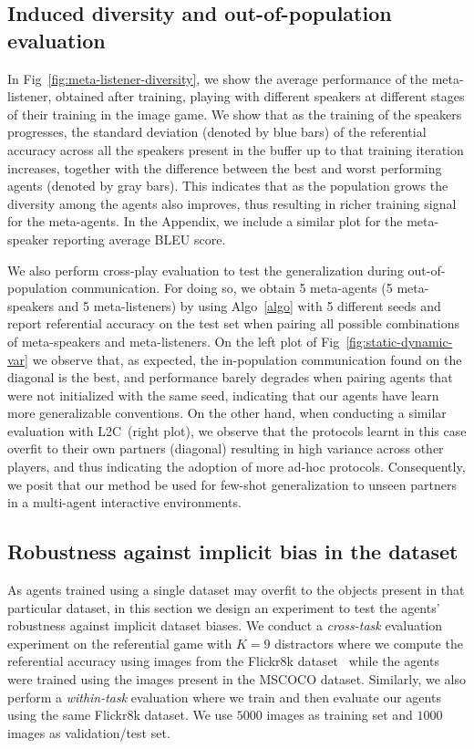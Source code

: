 \documentclass{article}
\newcommand{\ltc}{\textsc{L2C\xspace}}
\begin{document}
\subsection{Induced diversity and out-of-population evaluation}
\label{subsec:diversity}
In Fig~\ref{fig:meta-listener-diversity},  we show the average performance of the meta-listener, obtained after training, playing with different speakers at different stages of their training in the image game. We show that as the training of the speakers progresses, the standard deviation (denoted by blue bars) of the referential accuracy across all the speakers present in the buffer up to that training iteration increases, together with the difference between the best and worst performing agents (denoted by gray bars). This indicates that as the population grows the diversity among the agents also improves, thus resulting in richer training signal for the meta-agents. In the Appendix, we include a similar plot for the meta-speaker reporting average BLEU score.

We also perform cross-play evaluation to test the generalization during out-of-population communication. For doing so, we obtain 5 meta-agents (5 meta-speakers and 5 meta-listeners) by using Algo~\ref{algo} with 5 different seeds and report referential accuracy on the test set when pairing all possible combinations of meta-speakers and meta-listeners. On the left plot of Fig~\ref{fig:static-dynamic-var} we observe that, as expected, the in-population communication found on the diagonal is the best, and performance barely degrades when pairing agents that were not initialized with the same seed, indicating that our agents have learn more generalizable conventions. On the other hand, when conducting a similar evaluation with \ltc\ (right plot), we observe that the protocols learnt in this case overfit to their own partners (diagonal) resulting in high variance across other players, and thus indicating the adoption of more ad-hoc protocols. Consequently, we posit that our method be used for few-shot generalization to unseen partners in a multi-agent interactive environments.

\subsection{Robustness against implicit bias in the dataset}
\label{subsec:robustness}
As agents trained using a single dataset may overfit to the objects present in that particular dataset, in this section we design an experiment to test the agents' robustness against implicit dataset biases. We conduct a \emph{cross-task} evaluation experiment on the referential game with $K=9$ distractors where we compute the referential accuracy using images from the Flickr8k dataset~\citep{Hodosh2013FramingID} while the agents were trained using the images present in the MSCOCO dataset. Similarly, we also perform a \emph{within-task} evaluation where we train and then evaluate our agents using the same Flickr8k dataset. We use $5000$ images as training set and $1000$ images as validation/test set.
\end{document}
